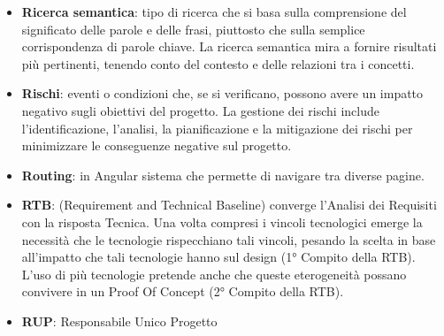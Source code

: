\documentclass[a4paper,12pt]{article}
\begin{document}
\begin{itemize}
    \item \textbf{Ricerca semantica}: tipo di ricerca che si basa sulla comprensione del significato delle parole e delle frasi, piuttosto che sulla semplice corrispondenza di parole chiave. La ricerca semantica mira a fornire risultati più pertinenti, tenendo conto del contesto e delle relazioni tra i concetti.
    \item \textbf{Rischi}: eventi o condizioni che, se si verificano, possono avere un impatto negativo sugli obiettivi del progetto. La gestione dei rischi include l'identificazione, l'analisi, la pianificazione e la mitigazione dei rischi per minimizzare le conseguenze negative sul progetto.
    \item \textbf{Routing}: in Angular sistema che permette di navigare tra diverse pagine. 
    \item \textbf{RTB}: (Requirement and Technical Baseline) converge l'Analisi dei Requisiti con la risposta Tecnica. Una volta compresi i vincoli tecnologici emerge la necessità che le tecnologie rispecchiano tali vincoli, pesando la scelta in base all'impatto che tali tecnologie hanno sul design (1° Compito della RTB). L'uso di più tecnologie pretende anche che queste eterogeneità possano convivere in un Proof Of Concept (2° Compito della RTB).
    \item \textbf{RUP}: Responsabile Unico Progetto
\end{itemize}
\end{document}
